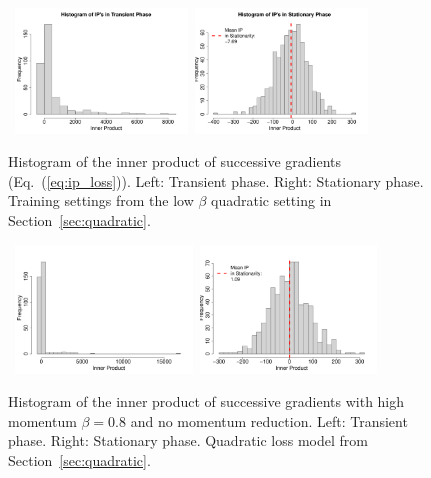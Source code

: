 \documentclass[conference]{IEEEtran}
\begin{document}
\begin{figure}[ht]
\mbox{\hspace{-0.1in}
  \includegraphics[width=1.8in]{fig/HistIPTrans.pdf}\hspace{-0.12in}
  \includegraphics[width=1.8in]{fig/HistIPStat.pdf}
}
\vspace{-0.2in}
  \caption{  Histogram of the inner product of successive gradients (Eq.~(\ref{eq:ip_loss})). 
  Left: Transient phase. 
  Right: Stationary phase.
  Training settings from the low $\beta$ quadratic setting in Section~\ref{sec:quadratic}.
  }
\label{fig:hist_ip}
\end{figure}
\begin{figure}[ht]
\mbox{\hspace{-0.1in}
  \includegraphics[width=1.85in]{fig/HighMomHistIPTrans.pdf}\hspace{-0.12in}
  \includegraphics[width=1.85in]{fig/HighMomHistIPStat.pdf}
}
\vspace{-0.2in}
  \caption{ Histogram of the inner product of successive gradients with high momentum $\beta=0.8$ and no momentum reduction. 
  Left: Transient phase. 
  Right: Stationary phase.
 Quadratic loss model from Section~\ref{sec:quadratic}.
  }
\label{fig:hist_ip_highmom}
\end{figure}
\end{document}
